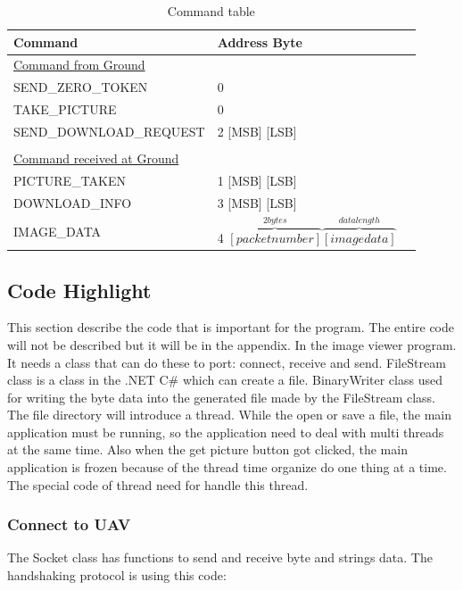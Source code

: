 \begin{table}[!htbp]

\begin{center}
\begin{tabular}{l l @{.} l}
 Command&
\multicolumn{2}{l}{Address Byte } \\

\hline
\underline{Command from Ground} & \\
SEND\_ZERO\_TOKEN & 0 \\
TAKE\_PICTURE & 0 \\
SEND\_DOWNLOAD\_REQUEST & 2 [MSB] [LSB]  \\
\\
\underline{Command received at Ground}\\
PICTURE\_TAKEN & 1 [MSB] [LSB]\\
DOWNLOAD\_INFO & 3 [MSB] [LSB]\\
IMAGE\_DATA & 4 $\overbrace{ [packet number]}^{2bytes} \overbrace{[image data]}^{data length}$ \\
\end{tabular}
\caption{Command table\label{command_table}}
\end{center}
\end{table}
 
 
\subsection{Code Highlight}

This section describe the code that is important for the program. The entire code will not be described but it will be in the appendix. In the image viewer program. It needs a class that can do these to port: connect, receive and send. FileStream class is a class in the .NET C\# which can create a file. BinaryWriter class used for writing the byte data into the generated file made by the FileStream class. The file directory will introduce a thread. While the open or save a file, the main application must be running, so the application need to deal with multi threads at the same time. Also when the get picture button got clicked, the main application is frozen because of the thread time organize do one thing at a time. The special code of thread need for handle this thread. 

\subsubsection*{Connect to UAV}
The Socket class has functions to send and receive byte and strings data. The handshaking protocol is using this code:

